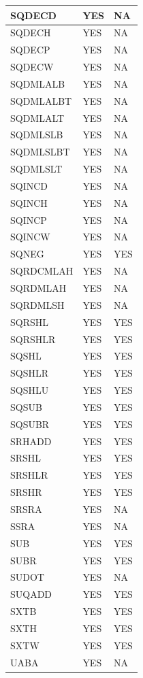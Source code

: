 \begin{longtable}{|l|l|l|}
\hline
SQDECD & YES & NA\\
\hline
SQDECH & YES & NA\\
\hline
SQDECP & YES & NA\\
\hline
SQDECW & YES & NA\\
\hline
SQDMLALB & YES & NA\\
\hline
SQDMLALBT & YES & NA\\
\hline
SQDMLALT & YES & NA\\
\hline
SQDMLSLB & YES & NA\\
\hline
SQDMLSLBT & YES & NA\\
\hline
SQDMLSLT & YES & NA\\
\hline
SQINCD & YES & NA\\
\hline
SQINCH & YES & NA\\
\hline
SQINCP & YES & NA\\
\hline
SQINCW & YES & NA\\
\hline
SQNEG & YES & YES\\
\hline
SQRDCMLAH & YES & NA\\
\hline
SQRDMLAH & YES & NA\\
\hline
SQRDMLSH & YES & NA\\
\hline
SQRSHL & YES & YES\\
\hline
SQRSHLR & YES & YES\\
\hline
SQSHL & YES & YES\\
\hline
SQSHLR & YES & YES\\
\hline
SQSHLU & YES & YES\\
\hline
SQSUB & YES & YES\\
\hline
SQSUBR & YES & YES\\
\hline
SRHADD & YES & YES\\
\hline
SRSHL & YES & YES\\
\hline
SRSHLR & YES & YES\\
\hline
SRSHR & YES & YES\\
\hline
SRSRA & YES & NA\\
\hline
SSRA & YES & NA\\
\hline
SUB & YES & YES\\
\hline
SUBR & YES & YES\\
\hline
SUDOT & YES & NA\\
\hline
SUQADD & YES & YES\\
\hline
SXTB & YES & YES\\
\hline
SXTH & YES & YES\\
\hline
SXTW & YES & YES\\
\hline
UABA & YES & NA\\

\end{longtable}
